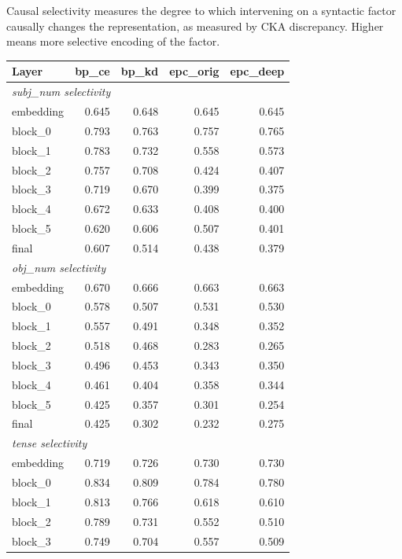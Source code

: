 \documentclass[11pt,a4paper]{article}
\begin{document}
Causal selectivity measures the degree to which intervening on a
syntactic factor causally changes the representation, as measured by
CKA discrepancy.  Higher means more selective encoding of the factor.

\begin{table}[h]
\centering
\begin{tabular}{lrrrr}
\toprule
\textbf{Layer} & \textbf{bp\_ce} & \textbf{bp\_kd} & \textbf{epc\_orig} & \textbf{epc\_deep} \\
\midrule
\multicolumn{5}{l}{\textit{subj\_num selectivity}} \\
\midrule
embedding & 0.645 & 0.648 & 0.645 & 0.645 \\
block\_0 & 0.793 & 0.763 & 0.757 & 0.765 \\
block\_1 & 0.783 & 0.732 & 0.558 & 0.573 \\
block\_2 & 0.757 & 0.708 & 0.424 & 0.407 \\
block\_3 & 0.719 & 0.670 & 0.399 & 0.375 \\
block\_4 & 0.672 & 0.633 & 0.408 & 0.400 \\
block\_5 & 0.620 & 0.606 & 0.507 & 0.401 \\
final & 0.607 & 0.514 & 0.438 & 0.379 \\
\midrule
\multicolumn{5}{l}{\textit{obj\_num selectivity}} \\
\midrule
embedding & 0.670 & 0.666 & 0.663 & 0.663 \\
block\_0 & 0.578 & 0.507 & 0.531 & 0.530 \\
block\_1 & 0.557 & 0.491 & 0.348 & 0.352 \\
block\_2 & 0.518 & 0.468 & 0.283 & 0.265 \\
block\_3 & 0.496 & 0.453 & 0.343 & 0.350 \\
block\_4 & 0.461 & 0.404 & 0.358 & 0.344 \\
block\_5 & 0.425 & 0.357 & 0.301 & 0.254 \\
final & 0.425 & 0.302 & 0.232 & 0.275 \\
\midrule
\multicolumn{5}{l}{\textit{tense selectivity}} \\
\midrule
embedding & 0.719 & 0.726 & 0.730 & 0.730 \\
block\_0 & 0.834 & 0.809 & 0.784 & 0.780 \\
block\_1 & 0.813 & 0.766 & 0.618 & 0.610 \\
block\_2 & 0.789 & 0.731 & 0.552 & 0.510 \\
block\_3 & 0.749 & 0.704 & 0.557 & 0.509 \\

\end{tabular}
\end{table}
\end{document}
